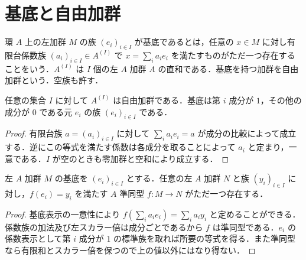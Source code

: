 \section{基底と自由加群}
\begin{defn}[加群の基底と自由加群]
環 $A$ 上の左加群 $M$ の族 $(e_i)_{i\in I}$ が基底であるとは，任意の $x\in M$ に対し有限台係数族 $(a_i)_{i\in I}\in A^{(I)}$ で $x=\sum_i a_ie_i$ を満たすものがただ一つ存在することをいう．$A^{(I)}$ は $I$ 個の左 $A$ 加群 $A$ の直和である．基底を持つ加群を自由加群という．空族も許す．
\end{defn}
\begin{prop}[自由加群の標準基底]
任意の集合 $I$ に対して $A^{(I)}$ は自由加群である．基底は第 $i$ 成分が $1$，その他の成分が $0$ である元 $e_i$ の族 $(e_i)_{i\in I}$ である．
\end{prop}
\begin{proof}
有限台族 $a=(a_i)_{i\in I}$ に対して $\sum_i a_ie_i=a$ が成分の比較によって成立する．逆にこの等式を満たす係数は各成分を取ることによって $a_i$ と定まり，一意である．$I$ が空のときも零加群と空和により成立する．
\end{proof}
\begin{prop}[自由加群の普遍性]
左 $A$ 加群 $M$ の基底を $(e_i)_{i\in I}$ とする．任意の左 $A$ 加群 $N$ と族 $(y_i)_{i\in I}$ に対し，$f(e_i)=y_i$ を満たす $A$ 準同型 $f:M\to N$ がただ一つ存在する．
\end{prop}
\begin{proof}
基底表示の一意性により $f(\sum_i a_ie_i)=\sum_i a_iy_i$ と定めることができる．係数族の加法及び左スカラー倍は成分ごとであるから $f$ は準同型である．$e_i$ の係数表示として第 $i$ 成分が $1$ の標準族を取れば所要の等式を得る．また準同型なら有限和とスカラー倍を保つので上の値以外にはなり得ない．
\end{proof}
